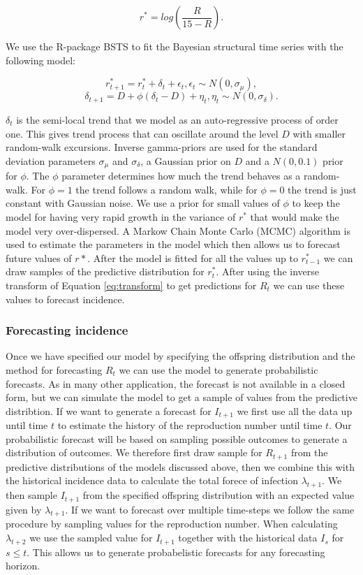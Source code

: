 \documentclass[12pt]{article}
\begin{document}
\begin{equation}
r^* = log\left(\frac{R}{15 - R}\right).
\label{eq:transform}
\end{equation}

We use the R-package BSTS \cite{scottBstsBayesianStructural2019} to fit the Bayesian structural time series with the following model:

\[r^*_{t+1} = r^*_t + \delta_t + \epsilon_t, \epsilon_t \sim N(0, \sigma_\mu),\]
\[\delta_{t+1} = D + \phi(\delta_t - D) + \eta_t, \eta_t \sim N(0, \sigma_\delta).\]

$\delta_t$ is the semi-local trend that we model as an auto-regressive process of order one. This gives trend process that can oscillate around the level $D$ with smaller random-walk excursions. Inverse gamma-priors are used for the standard deviation parameters $\sigma_\mu$ and $\sigma_\delta$, a Gaussian prior on $D$ and a $N(0, 0.1)$ prior for $\phi$. The $\phi$ parameter determines how much the trend behaves as a random-walk. For $\phi=1$ the trend follows a random walk, while for $\phi=0$ the trend is just constant with Gaussian noise. We use a prior for small values of $\phi$ to keep the model for having very rapid growth in the variance of $r^*$ that would make the model very over-dispersed. A Markow Chain Monte Carlo (MCMC) algorithm is used to estimate the parameters in the model which then allows us to forecast future values of $r*$. After the model is fitted for all the values up to  $r^*_{t-1}$ we can draw samples of the predictive distribution for $r^*_t$. After using the inverse transform of Equation \ref{eq:transform} to get predictions for $R_t$ we can use these values to forecast incidence. 


\subsubsection{Forecasting incidence}

Once we have specified our model by specifying the offspring distribution and the method for forecasting $R_t$ we can use the model to generate probabilistic forecasts. As in many other application, the forecast is not available in a closed form, but we can simulate the model to get a sample of values from the predictive distribtion. If we want to generate a forecast for $I_{t+1}$ we first use all the data up until time $t$ to estimate the history of the reproduction number until time $t$. Our probabilistic forecast will be based on sampling possible outcomes to generate a distribution of outcomes. We therefore first draw sample for $R_{t+1}$ from the predictive distributions of the models discussed above, then we combine this with the historical incidence data to calculate the total forece of infection $\lambda_{t+1}$. We then sample $I_{t+1}$ from the specified offspring distribution with an expected value given by $\lambda_{t+1}$. If we want to forecast over multiple time-steps we follow the same procedure by sampling values for the reproduction number. When calculating $\lambda_{t+2}$ we use the sampled value for $I_{t+1}$ together with the historical data ${I_s}$ for $s\leq t$. This allows us to generate probabelistic forecasts for any forecasting horizon.
\end{document}
